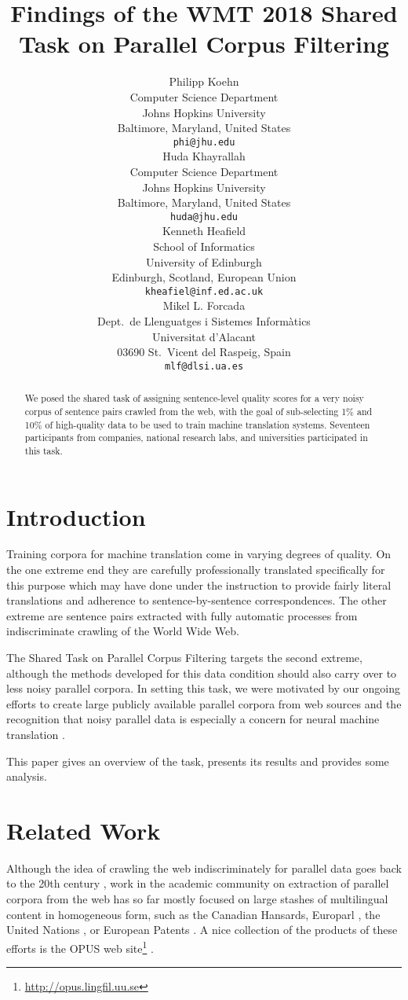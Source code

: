 \documentclass[11pt,a4paper]{article}
\title{Findings of the WMT 2018 Shared Task on Parallel Corpus Filtering}
\author{Philipp Koehn \\
  Computer Science Department \\
  Johns Hopkins University \\
  Baltimore, Maryland, United States \\
  {\tt phi@jhu.edu} \\\And
  Huda Khayrallah \\
  Computer Science Department \\
  Johns Hopkins University \\
  Baltimore, Maryland, United States \\
  {\tt huda@jhu.edu} \\\AND
  Kenneth Heafield \\
  School of Informatics \\
  University of Edinburgh\\
  Edinburgh, Scotland, European Union \\
  {\tt kheafiel@inf.ed.ac.uk} \\\And
  Mikel L. Forcada \\
  Dept.\ de Llenguatges i Sistemes
    Inform{\`a}tics \\
  Universitat d'Alacant  \\
  03690 St.\ Vicent del Raspeig, Spain \\
  {\tt mlf@dlsi.ua.es} \\}
\date{}
\begin{document}
\maketitle
\begin{abstract}
We posed the shared task of assigning sen\-tence-level quality scores for a very noisy corpus of sentence pairs crawled from the web, with the goal of sub-selecting 1\% and 10\% of high-quality data to be used to train machine translation systems. Seventeen participants from companies, national research labs, and universities participated in this task.
\end{abstract}

\section{Introduction}
Training corpora for machine translation come 
in varying degrees of quality. On the one extreme end they are carefully 
professionally translated specifically for this purpose
which may have done under the instruction to provide fairly 
literal translations and adherence to sentence-by-sentence correspondences. 
The other extreme are sentence pairs extracted with fully automatic processes 
from indiscriminate crawling of the World Wide Web.

The Shared Task on Parallel Corpus Filtering targets the second 
extreme, although the methods developed for this data condition should
also carry over to less noisy parallel corpora. 
In setting this task, we were motivated by our ongoing efforts
to create large publicly available parallel corpora from web 
sources and the recognition that noisy parallel data is especially
a concern for neural machine translation \citep{W18-2709}.

This paper gives an overview of the task, presents its results
and provides some analysis.

\section{Related Work}
Although the idea of crawling the web indiscriminately for parallel data goes back to the 20th century \citep{Resnik:1999}, work in the academic community on extraction of parallel corpora from the web has so far mostly focused on large stashes of multilingual content in homogeneous form, such as the Canadian Hansards, Europarl \citep{Koehn:2005:MTS}, the United Nations \citep{MTS09:Rafalovitch,UN:LREC2015}, or European Patents \citep{eamt11:Taeger}. A nice collection of the products of these efforts is the OPUS web site\footnote{\url{http://opus.lingfil.uu.se}} \citep{SkadinsEA:LREC14}.
\end{document}
